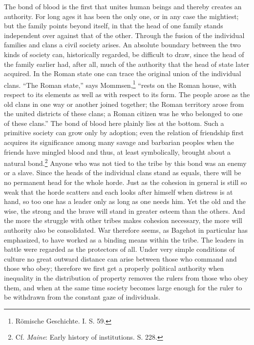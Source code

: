 \documentclass[12pt,a4paper,openany]{book}
\newcommand{\opage}[1]{\marginnote{\footnotesize\textit{[#1]}}}
\begin{document}
The bond of blood is the first that unites human beings and thereby creates an
authority. For long ages it has been the only one, or in any case the
mightiest; but the family points beyond itself, in that the head of one family
stands independent \opage{60}over against that of the other. Through the
fusion of the individual families and clans a civil society arises. An
absolute boundary between the two kinds of society can, historically regarded,
be difficult to draw, since the head of the family earlier had, after all,
much of the authority that the head of state later acquired. In the Roman
state one can trace the original union of the individual clans. ``The Roman
state,'' says Mommsen,\footnote[1]{Römische Geschichte. I. S. 59.} ``rests on
the Roman house, with respect to its elements as well as with respect to its
form. The people arose as the old clans in one way or another joined together;
the Roman territory arose from the united districts of these clans; a Roman
citizen was he who belonged to one of these clans.'' The bond of blood here
plainly lies at the bottom. Such a primitive society can grow only by
adoption; even the relation of friendship first acquires its significance
among many savage and barbarian peoples when the friends have mingled blood
and thus, at least symbolically, brought about a natural bond.\footnote[2]{Cf.
\emph{Maine}: Early history of institutions. S. 228.} Anyone who was not tied
to the tribe by this bond was an enemy or a slave. Since the heads of the
individual clans stand as equals, there will be no permanent head for the
whole horde. Just as the cohesion in general is still so weak that the horde
scatters and each looks after himself when distress is at hand, so too one has
a leader only \opage{61}as long as one needs him. Yet the old and the wise,
the strong and the brave will stand in greater esteem than the others. And the
more the struggle with other tribes makes cohesion necessary, the more will
authority also be consolidated. War therefore seems, as Bagehot in particular
has emphasized, to have worked as a binding means within the tribe. The
leaders in battle were regarded as the protectors of all. Under very simple
conditions of culture no great outward distance can arise between those who
command and those who obey; therefore we first get a properly political %
authority when inequality in the distribution of property removes the rulers
from those who obey them, and when at the same time society becomes large
enough for the ruler to be withdrawn from the constant gaze of individuals.
\end{document}
